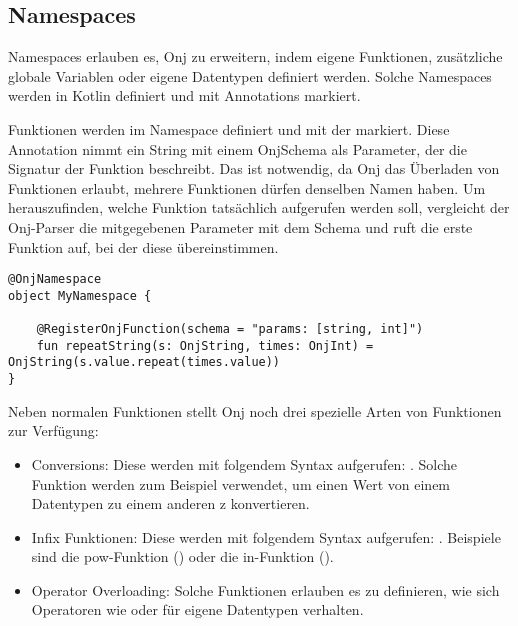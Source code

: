 
\subsection{Namespaces}\label{subsec:namespaces}

\renewcommand{\kapitelautor}{Autor: Marvin Kurka}

Namespaces erlauben es, Onj zu erweitern, indem eigene Funktionen, zusätzliche globale Variablen oder
eigene Datentypen definiert werden.
Solche Namespaces werden in Kotlin definiert und mit Annotations markiert.

Funktionen werden im Namespace definiert und mit der  markiert.
Diese Annotation nimmt ein String mit einem OnjSchema als Parameter, der die Signatur der Funktion beschreibt.
Das ist notwendig, da Onj das Überladen von Funktionen erlaubt, \dah mehrere Funktionen dürfen denselben Namen haben.
Um herauszufinden, welche Funktion tatsächlich aufgerufen werden soll, vergleicht der Onj-Parser die mitgegebenen
Parameter mit dem Schema und ruft die erste Funktion auf, bei der diese übereinstimmen.

\begin{verbatim}
@OnjNamespace
object MyNamespace {

    @RegisterOnjFunction(schema = "params: [string, int]")
    fun repeatString(s: OnjString, times: OnjInt) = OnjString(s.value.repeat(times.value))
}
\end{verbatim}

Neben normalen Funktionen stellt Onj noch drei spezielle Arten von Funktionen zur Verfügung:

\begin{itemize}
    \item Conversions: Diese werden mit folgendem Syntax aufgerufen: .
        Solche Funktion werden zum Beispiel verwendet, um einen Wert von einem Datentypen zu einem anderen z
        konvertieren.
    \item Infix Funktionen: Diese werden mit folgendem Syntax aufgerufen: .
        Beispiele sind die pow-Funktion () oder die in-Funktion (\inlineOnj{3 in [1, 2, 3, 4]}).
    \item Operator Overloading: Solche Funktionen erlauben es zu definieren, wie sich Operatoren wie
        \inlineOnj{+} oder \inlineOnj{*} für eigene Datentypen verhalten.
\end{itemize}

